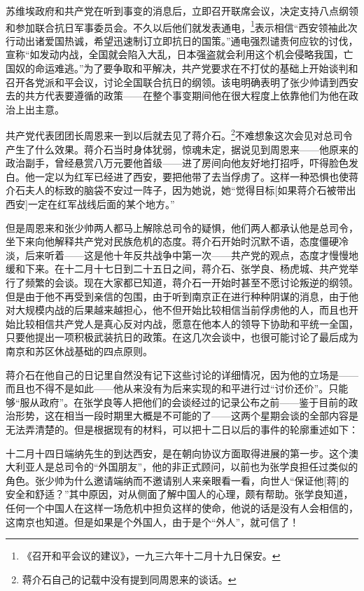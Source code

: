 \documentclass[10pt]{book}
\begin{document}
苏维埃政府和共产党在听到事变的消息后，立即召开联席会议，决定支持八点纲领和参加联合抗日军事委员会。不久以后他们就发表通电，\footnote{《召开和平会议的建议》，一九三六年十二月十九日保安。}表示相信“西安领袖此次行动出诸爱国热诚，希望迅速制订立即抗日的国策。”通电强烈谴责何应钦的讨伐，宣称“如发动内战，全国就会陷入大乱，日本强盗就会利用这个机会侵略我国，亡国奴的命运难逃。”为了要争取和平解决，共产党要求在不打仗的基础上开始谈判和召开各党派和平会议，讨论全国联合抗日的纲领。该电明确表明了张少帅请到西安去的共方代表要遵循的政策——在整个事变期间他在很大程度上依靠他们为他在政治上出主意。

共产党代表团团长周恩来一到以后就去见了蒋介石。\footnote{蒋介石自己的记载中没有提到同周恩来的谈话。}不难想象这次会见对总司令产生了什么效果。蒋介石当时身体犹弱，惊魂未定，据说见到周恩来——他原来的政治副手，曾经悬赏八万元要他首级——进了房间向他友好地打招呼，吓得脸色发白。他一定以为红军已经进了西安，要把他带了去当俘虏了。这样一种恐惧也使蒋介石夫人的标致的脑袋不安过一阵子，因为她说，她“觉得目标[如果蒋介石被带出西安]一定在红军战线后面的某个地方。”

但是周恩来和张少帅两人都马上解除总司令的疑惧，他们两人都承认他是总司令，坐下来向他解释共产党对民族危机的态度。蒋介石开始时沉默不语，态度僵硬冷淡，后来听着——这是他十年反共战争中第一次——共产党的观点，态度才慢慢地缓和下来。在十二月十七日到二十五日之间，蒋介石、张学良、杨虎城、共产党举行了频繁的会谈。现在大家都已知道，蒋介石一开始时甚至不愿讨论叛逆的纲领。但是由于他不再受到亲信的包围，由于听到南京正在进行种种阴谋的消息，由于他对大规模内战的后果越来越担心，他不但开始比较相信当前俘虏他的人，而且也开始比较相信共产党人是真心反对内战，愿意在他本人的领导下协助和平统一全国，只要他提出一项积极武装抗日的政策。在这几次会谈中，也很可能讨论了最后成为南京和苏区休战基础的四点原则。

蒋介石在他自己的日记里自然没有记下这些讨论的详细情况，因为他的立场是——而且也不得不是如此——他从来没有为后来实现的和平进行过“讨价还价”。只能够“服从政府”。在张学良等人把他们的会谈经过的记录公布之前——鉴于目前的政治形势，这在相当一段时期里大概是不可能的了——这两个星期会谈的全部内容是无法弄清楚的。但是根据现有的材料，可以把十二日以后的事件的轮廓重述如下：

十二月十四日端纳先生的到达西安，是在朝向协议方面取得进展的第一步。这个澳大利亚人是总司令的“外国朋友”，他的非正式顾问，以前也为张学良担任过类似的角色。张少帅为什么邀请端纳而不邀请别人来亲眼看一看，向世人“保证他[蒋]的安全和舒适？”其中原因，对从侧面了解中国人的心理，颇有帮助。张学良知道，任何一个中国人在这样一场危机中担负这样的使命，他说的话是没有人会相信的，这南京也知道。但是如果是个外国人，由于是个“外人”，就可信了！
\end{document}

